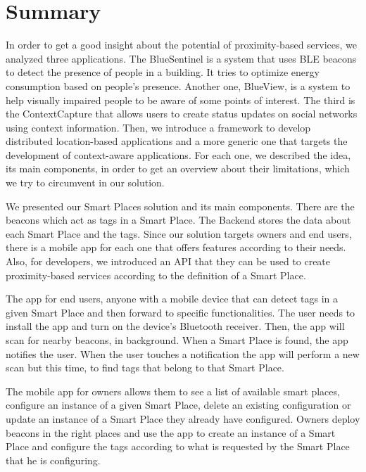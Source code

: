 \section{Summary}
\label{sec:solution_summary}
In order to get a good insight about the potential of proximity-based services, we analyzed three applications.
The BlueSentinel is a system that uses \gls{BLE} beacons to detect the presence of people in a building. It tries to optimize energy consumption based on people's presence.
Another one, BlueView, is a system to help visually impaired people to be aware of some points of interest.
The third is the ContextCapture that allows users to create status updates on social networks using context information.
Then, we introduce a framework to develop distributed location-based applications and a more generic one that targets the development of context-aware applications.
For each one, we described the idea, its main components, in order to get an overview about their limitations, which we try to circumvent in our solution.

We presented our Smart Places solution and its main components.
There are the beacons which act as tags in a Smart Place.
The Backend stores the data about each Smart Place and the tags.
Since our solution targets owners and end users, there is a mobile app for each one that offers features according to their needs.
Also, for developers, we introduced an \gls{API} that they can be used to create proximity-based services according to the definition of a Smart Place.

The app for end users, anyone with a mobile device that can detect tags in a given Smart Place and then forward to specific functionalities.
The user needs to install the app and turn on the device's Bluetooth receiver.
Then, the app will scan for nearby beacons, in background.
When a Smart Place is found, the app notifies the user.
When the user touches a notification the app will perform a new scan but this time, to find tags that belong to that Smart Place.

The mobile app for owners allows them to see a list of available smart places, configure an instance of a given Smart Place, delete an existing configuration or update an instance of a Smart Place they already have configured.
Owners deploy beacons in the right places and use the app to create an instance of a Smart Place and configure the tags according to what is requested by the Smart Place that he is configuring.

